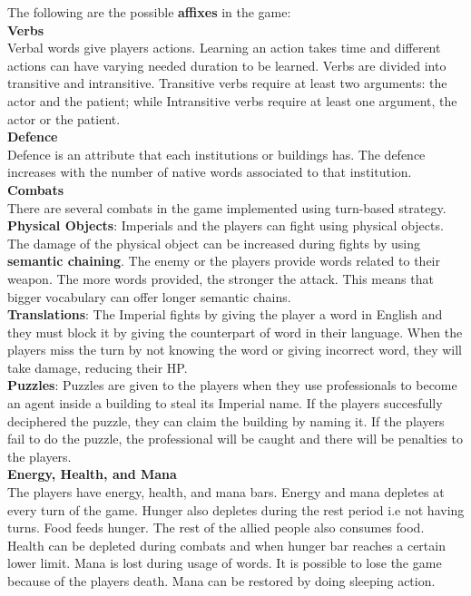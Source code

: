 \documentclass[11pt]{article}
\begin{document}
The following are the possible \textbf{affixes} in the game:\\


\textbf{Verbs}\\
Verbal words give players actions. Learning an action takes time and different actions can have varying needed duration to be learned. Verbs are divided into transitive and intransitive. Transitive verbs require at least two arguments: the actor and the patient; while Intransitive verbs require at least one argument, the actor or the patient.\\

\textbf{Defence}\\
Defence is an attribute that each institutions or buildings has. The defence increases with the number of native words associated to that institution.\\

\textbf{Combats}\\
There are several combats in the game implemented using turn-based strategy.\\
\textbf{Physical Objects}:
Imperials and the players can fight using physical objects. The damage of the physical object can be increased during fights by using \textbf{semantic chaining}. The enemy or the players provide words related to their weapon. The more words provided, the stronger the attack. This means that bigger vocabulary can offer longer semantic chains.\\
\textbf{Translations}:
The Imperial fights by giving the player a word in English and they must block it by giving the counterpart of word in their language. When the players miss the turn by not knowing the word or giving incorrect word, they will take damage, reducing their HP.\\
\textbf{Puzzles}:
Puzzles are given to the players when they use professionals to become an agent inside a building to steal its Imperial name. If the players succesfully deciphered the puzzle, they can claim the building by naming it. If the players fail to do the puzzle, the professional will be caught and there will be penalties to the players. \\

\textbf{Energy, Health, and Mana}\\
The players have energy, health, and mana bars. Energy  and mana depletes at every turn of the game. Hunger also depletes during the rest period i.e not having turns. Food feeds hunger. The rest of the allied people also consumes food. Health can be depleted during combats and when hunger bar reaches a certain lower limit. Mana is lost  during usage of words. It is possible to lose the game because of the players death. Mana can be restored by doing sleeping action.\\
\end{document}
